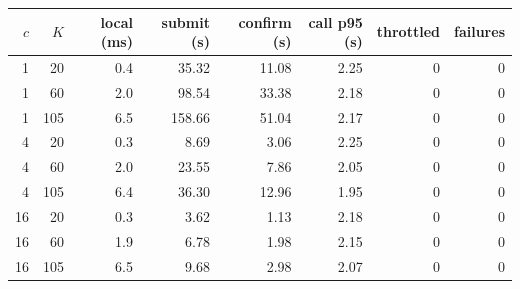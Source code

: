 \begin{tabular}{rrrrrrrr}
\toprule
$c$ & $K$ & local (ms) & submit (s) & confirm (s) & call p95 (s) & throttled & failures\\
\midrule
1 & 20 & 0.4 & 35.32 & 11.08 & 2.25 & 0 & 0\\
1 & 60 & 2.0 & 98.54 & 33.38 & 2.18 & 0 & 0\\
1 & 105 & 6.5 & 158.66 & 51.04 & 2.17 & 0 & 0\\
4 & 20 & 0.3 & 8.69 & 3.06 & 2.25 & 0 & 0\\
4 & 60 & 2.0 & 23.55 & 7.86 & 2.05 & 0 & 0\\
4 & 105 & 6.4 & 36.30 & 12.96 & 1.95 & 0 & 0\\
16 & 20 & 0.3 & 3.62 & 1.13 & 2.18 & 0 & 0\\
16 & 60 & 1.9 & 6.78 & 1.98 & 2.15 & 0 & 0\\
16 & 105 & 6.5 & 9.68 & 2.98 & 2.07 & 0 & 0\\
\bottomrule
\end{tabular}
